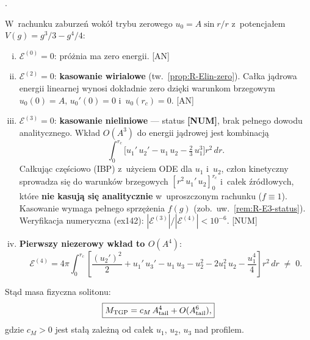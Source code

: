\begin{theorem}%
\label{thm:R-A4}
.

\noindent
W~rachunku zaburze\'n wok\'o\l{} trybu zerowego
$u_0 = A\sin r/r$ z~potencja\l{}em $V(g) = g^3/3 - g^4/4$:
\begin{enumerate}[(i)]
  \item $\mathcal{E}^{(0)} = 0$: pr\'o\.znia ma zero energii. \hfill[AN]
  \item $\mathcal{E}^{(2)} = 0$: \textbf{kasowanie wirialowe}
    (tw.~\ref{prop:R-Elin-zero}).
    Ca\l{}ka j\k{a}drowa energii linearnej wynosi
    dok\l{}adnie zero dzi\k{e}ki warunkom brzegowym
    $u_0(0) = A,\, u_0'(0) = 0$ i~$u_0(r_c) = 0$. \hfill[AN]
  \item $\mathcal{E}^{(3)} = 0$: \textbf{kasowanie nieliniowe} ---
    status \textbf{[NUM]}, brak pe\l{}nego dowodu analitycznego.
    Wk\l{}ad $O(A^3)$ do energii j\k{a}drowej jest kombinacj\k{a}
    \[
      \int_0^{r_c}\!\bigl[
        u_1'\,u_2' - u_1\,u_2 - \tfrac{2}{3}\,u_1^3
      \bigr]r^2\,dr.
    \]
    Ca\l{}kuj\k{a}c cz\k{e}\'sciowo (IBP) z~u\.zyciem ODE
    dla $u_1$ i~$u_2$, cz\l{}on kinetyczny sprowadza si\k{e} do
    warunk\'ow brzegowych $[r^2\,u_1'\,u_2]_0^{r_c}$
    i~ca\l{}ek \'zr\'od\l{}owych, kt\'ore \textbf{nie kasuj\k{a}
    si\k{e} analitycznie} w~uproszczonym rachunku ($f \equiv 1$).
    Kasowanie wymaga pe\l{}nego sprzężenia $f(g)$
    (zob.\ uw.~\ref{rem:R-E3-status}).
    Weryfikacja numeryczna (ex142):
    $|\mathcal{E}^{(3)}|/|\mathcal{E}^{(4)}| < 10^{-6}$. \hfill[NUM]
  \item \textbf{Pierwszy niezerowy wk\l{}ad to $O(A^4)$}:
    \begin{equation}\label{eq:R-E4}
      \mathcal{E}^{(4)}
      = 4\pi\!\int_0^{r_c}\!\left[
        \frac{(u_2')^2}{2} + u_1'\,u_3'
        - u_1\,u_3 - u_2^2 - 2u_1^2\,u_2
        - \frac{u_1^4}{4}
      \right]r^2\,dr
      \;\neq\; 0.
    \end{equation}
\end{enumerate}
St\k{a}d masa fizyczna solitonu:
\begin{equation}\label{eq:R-mass-A4}
  \boxed{M_{\rm TGP} = c_M\,A_{\rm tail}^4 + O(A_{\rm tail}^6),}
\end{equation}
gdzie $c_M > 0$ jest sta\l{}\k{a} zale\.zn\k{a} od
ca\l{}ek $u_1$, $u_2$, $u_3$ nad profilem.


\end{theorem}
